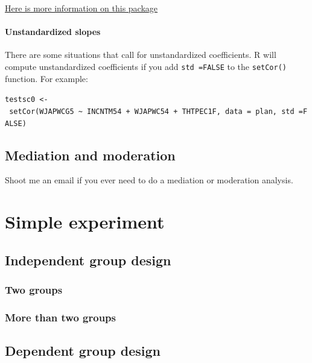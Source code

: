 \documentclass[
]{book}
\begin{document}
\href{https://cran.r-project.org/web/packages/apaTables/vignettes/apaTables.html}{Here is more information on this package}

\hypertarget{unstandardized-slopes}{%
\subsubsection{Unstandardized slopes}\label{unstandardized-slopes}}

There are some situations that call for unstandardized coefficients. R will compute unstandardized coefficients if you add \texttt{std\ =FALSE} to the \texttt{setCor()} function. For example:

\texttt{testsc0\ \textless{}-\ setCor(WJAPWCG5\ \textasciitilde{}\ INCNTM54\ +\ WJAPWC54\ +\ THTPEC1F,\ data\ =\ plan,\ std\ =FALSE)}

\hypertarget{mediation-and-moderation}{%
\section{Mediation and moderation}\label{mediation-and-moderation}}

Shoot me an email if you ever need to do a mediation or moderation analysis.

\hypertarget{simple-experiment}{%
\chapter{Simple experiment}\label{simple-experiment}}

\hypertarget{independent-group-design}{%
\section{Independent group design}\label{independent-group-design}}

\hypertarget{two-groups}{%
\subsection{Two groups}\label{two-groups}}

\hypertarget{more-than-two-groups}{%
\subsection{More than two groups}\label{more-than-two-groups}}

\hypertarget{dependent-group-design}{%
\section{Dependent group design}\label{dependent-group-design}}
\end{document}
